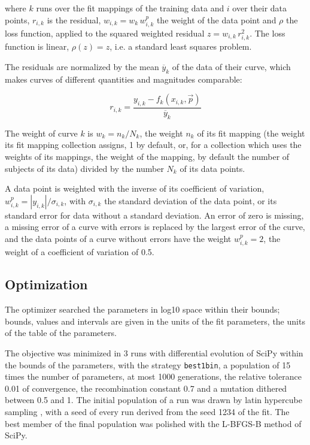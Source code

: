where $k$ runs over the fit mappings of the training data and $i$ over their data points, $r_{i,k}$ is the residual, $w_{i,k} = w_k\, w^{p}_{i,k}$ the weight of the data point and $\rho$ the loss function, applied to the squared weighted residual $z = w_{i,k}\, r_{i,k}^2$. The loss function is linear, $\rho(z) = z$, i.e. a standard least squares problem.

The residuals are normalized by the mean $\overline{y}_k$ of the data of their curve, which makes curves of different quantities and magnitudes comparable:

\begin{equation}
r_{i,k} = \frac{y_{i,k} - f_k(x_{i,k}, \vec{p})}{\overline{y}_k}
\end{equation}

The weight of curve $k$ is $w_k = n_k / N_k$, the weight $n_k$ of its fit mapping (the weight its fit mapping collection assigns, 1 by default, or, for a collection which uses the weights of its mappings, the weight of the mapping, by default the number of subjects of its data) divided by the number $N_k$ of its data points.

A data point is weighted with the inverse of its coefficient of variation, $w^{p}_{i,k} = |y_{i,k}| / \sigma_{i,k}$, with $\sigma_{i,k}$ the standard deviation of the data point, or its standard error for data without a standard deviation. An error of zero is missing, a missing error of a curve with errors is replaced by the largest error of the curve, and the data points of a curve without errors have the weight $w^{p}_{i,k} = 2$, the weight of a coefficient of variation of 0.5.

\subsection{Optimization}

The optimizer searched the parameters in log10 space within their bounds; bounds, values and intervals are given in the units of the fit parameters, the units of the table of the parameters.

The objective was minimized in 3 runs with differential evolution \cite{Storn1997} of SciPy \cite{Virtanen2020} within the bounds of the parameters, with the strategy \texttt{best1bin}, a population of 15 times the number of parameters, at most 1000 generations, the relative tolerance 0.01 of convergence, the recombination constant 0.7 and a mutation dithered between 0.5 and 1. The initial population of a run was drawn by latin hypercube sampling \cite{McKay1979}, with a seed of every run derived from the seed 1234 of the fit. The best member of the final population was polished with the L-BFGS-B method of SciPy.

